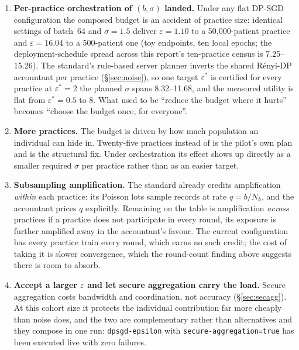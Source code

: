 \begin{enumerate}
  \item \textbf{Per-practice orchestration of $(b, \sigma)$ landed.} Under any flat DP-SGD
        configuration the composed budget is an accident of practice size: identical settings of
        batch~64 and $\sigma = 1.5$ deliver $\varepsilon = 1.10$ to a 50,000-patient practice and
        $\varepsilon = 16.04$ to a 500-patient one (toy endpoints, ten local epochs; the
        deployment-schedule spread across this report's ten-practice census is 7.25--15.26). The standard's rule-based server planner inverts the shared R\'enyi-DP accountant
        per practice (\S\ref{sec:noise}), so one target $\varepsilon^{*}$ is certified for every
        practice at $\varepsilon^{*} = 2$ the planned $\sigma$ spans 8.32--11.68, and the measured
        utility is flat from $\varepsilon^{*} = 0.5$ to $8$. What used to be ``reduce the budget
        where it hurts'' becomes ``choose the budget once, for everyone''.
  \item \textbf{More practices.} The budget is driven by how much population an individual can hide
        in. Twenty-five practices instead of \NumPractices{} is the pilot's own plan and is the
        structural fix. Under orchestration its effect shows up directly as a smaller required
        $\sigma$ per practice rather than as an easier target.
  \item \textbf{Subsampling amplification.} The standard already credits amplification
        \emph{within} each practice: its Poisson lots sample records at rate $q = b/N_k$, and the
        accountant prices $q$ explicitly. Remaining on the table is amplification \emph{across}
        practices if a practice does not participate in every round, its exposure is further
        amplified away in the accountant's favour. The current configuration has every practice
        train every round, which earns no such credit; the cost of taking it is slower convergence,
        which the round-count finding above suggests there is room to absorb.
  \item \textbf{Accept a larger $\varepsilon$ and let secure aggregation carry the load.} Secure
        aggregation costs bandwidth and coordination, not accuracy (\S\ref{sec:secagg}). At this
        cohort size it protects the individual contribution far more cheaply than noise does, and
        the two are complementary rather than alternatives and they compose in one run:
        \texttt{dpsgd-epsilon} with \texttt{secure-aggregation=true} has been executed live with
        zero failures.
\end{enumerate}


